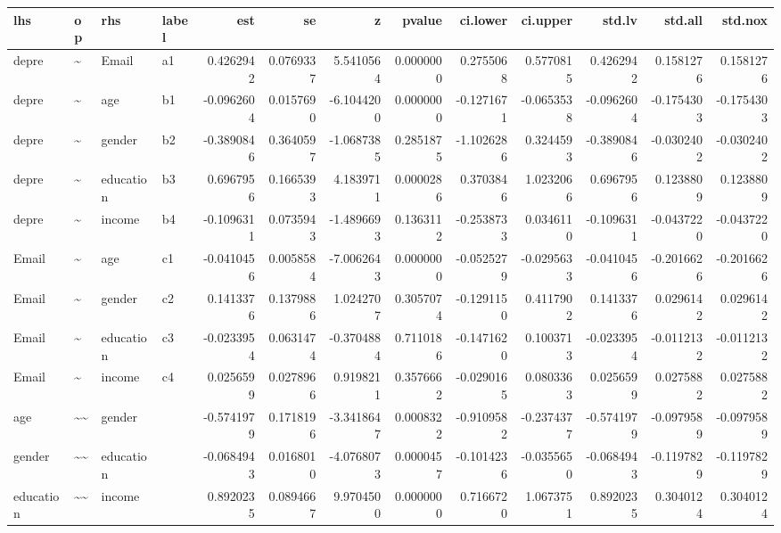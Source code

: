 \documentclass[
]{article}
\begin{document}
\begin{table}[!h]
\centering
\begin{tabular}[t]{llllrrrrrrrrr}
\toprule
lhs & op & rhs & label & est & se & z & pvalue & ci.lower & ci.upper & std.lv & std.all & std.nox\\
\midrule
depre & \textasciitilde{} & Email & a1 & 0.4262942 & 0.0769337 & 5.5410564 & 0.0000000 & 0.2755068 & 0.5770815 & 0.4262942 & 0.1581276 & 0.1581276\\
depre & \textasciitilde{} & age & b1 & -0.0962604 & 0.0157690 & -6.1044200 & 0.0000000 & -0.1271671 & -0.0653538 & -0.0962604 & -0.1754303 & -0.1754303\\
depre & \textasciitilde{} & gender & b2 & -0.3890846 & 0.3640597 & -1.0687385 & 0.2851875 & -1.1026286 & 0.3244593 & -0.3890846 & -0.0302402 & -0.0302402\\
depre & \textasciitilde{} & education & b3 & 0.6967956 & 0.1665393 & 4.1839711 & 0.0000286 & 0.3703846 & 1.0232066 & 0.6967956 & 0.1238809 & 0.1238809\\
depre & \textasciitilde{} & income & b4 & -0.1096311 & 0.0735943 & -1.4896693 & 0.1363112 & -0.2538733 & 0.0346110 & -0.1096311 & -0.0437220 & -0.0437220\\
\addlinespace
Email & \textasciitilde{} & age & c1 & -0.0410456 & 0.0058584 & -7.0062643 & 0.0000000 & -0.0525279 & -0.0295633 & -0.0410456 & -0.2016626 & -0.2016626\\
Email & \textasciitilde{} & gender & c2 & 0.1413376 & 0.1379886 & 1.0242707 & 0.3057074 & -0.1291150 & 0.4117902 & 0.1413376 & 0.0296142 & 0.0296142\\
Email & \textasciitilde{} & education & c3 & -0.0233954 & 0.0631474 & -0.3704884 & 0.7110186 & -0.1471620 & 0.1003713 & -0.0233954 & -0.0112132 & -0.0112132\\
Email & \textasciitilde{} & income & c4 & 0.0256599 & 0.0278966 & 0.9198211 & 0.3576662 & -0.0290165 & 0.0803363 & 0.0256599 & 0.0275882 & 0.0275882\\
age & \textasciitilde{}\textasciitilde{} & gender &  & -0.5741979 & 0.1718196 & -3.3418647 & 0.0008322 & -0.9109582 & -0.2374377 & -0.5741979 & -0.0979589 & -0.0979589\\
\addlinespace
gender & \textasciitilde{}\textasciitilde{} & education &  & -0.0684943 & 0.0168010 & -4.0768073 & 0.0000457 & -0.1014236 & -0.0355650 & -0.0684943 & -0.1197829 & -0.1197829\\
education & \textasciitilde{}\textasciitilde{} & income &  & 0.8920235 & 0.0894667 & 9.9704500 & 0.0000000 & 0.7166720 & 1.0673751 & 0.8920235 & 0.3040124 & 0.3040124\\

\end{tabular}
\end{table}
\end{document}
